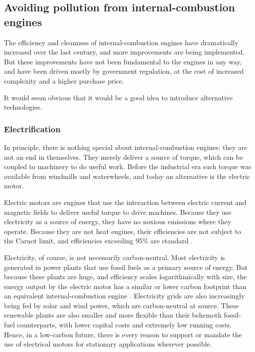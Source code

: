 \subsection{Avoiding pollution from internal\hyp{}combustion engines} \label{par:carbon-neutral}

The efficiency and cleanness of internal\hyp{}combustion engines have
dramatically increased over the last century, and more improvements are being
implemented. But these improvements have not been fundamental to the engines in
any way, and have been driven mostly by government regulation, at the cost of
increased complexity and a higher purchase price.

It would seem obvious that it would be a good idea to introduce alternative
technologies. 

\subsubsection{Electrification}

In principle, there is nothing special about internal\hyp{}combustion engines:
they are not an end in themselves. They mere\-ly deliver a source of torque,
which can be coupled to machinery to do useful work. Before the industrial era
such torque was available from windmills and waterwheels, and today an
alternative is the electric motor.

Electric motors are engines that use the interaction between electric current
and magnetic fields to deliver useful torque to drive machines. Because they use
electricity as a source of energy, they have no noxious emissions where they
operate. Because they are not heat engines, their efficiencies are not subject
to the Carnot limit, and efficiencies exceeding 95\% are standard \autocite{Li2012}.

Electricity, of course, is not necessarily carbon-neutral. Most electricity is
generated in power plants that use fossil fuels as a primary source of energy.
But because these plants are huge, and efficiency scales logarithmically with
size, the energy output by the electric motor has a similar or lower carbon
footprint than an equivalent internal\hyp{}combustion engine
\autocite{Doucette2011}. Electricity grids are also increasingly being fed by
solar and wind power, which are carbon-neutral at source. These renewable plants
are also smaller and more flexible than their behemoth fossil-fuel counterparts,
with lower capital costs and extremely low running costs. Hence, in a low-carbon
future, there is every reason to support or mandate the use of electrical motors
for stationary applications wherever possible.

